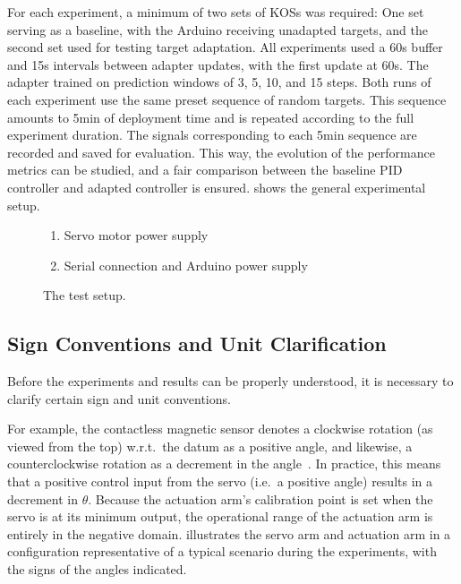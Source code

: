 For each experiment, a minimum of two sets of KOSs was required:
One set serving as a baseline, with the Arduino receiving unadapted targets, and the second set used for testing target adaptation.
All experiments used a 60\si{\second} buffer and 15\si{\second} intervals between adapter updates, with the first update at 60\si{\second}.
The adapter trained on prediction windows of 3, 5, 10, and 15 steps.
Both runs of each experiment use the same preset sequence of random targets.
This sequence amounts to 5\si{\minute} of deployment time and is repeated according to the full experiment duration.
The signals corresponding to each 5\si{\minute} sequence are recorded and saved for evaluation.
This way, the evolution of the performance metrics can be studied, and a fair comparison between the baseline PID controller and adapted controller is ensured.
 shows the general experimental setup.

\begin{figure}
    \centering
    \def\svgwidth{0.75\linewidth}
    \footnotesize\selectfont
    \begin{enumerate}
        \small
        \item Servo motor power supply \label{item:servo-power}
        \item Serial connection and Arduino power supply \label{item:serial}
    \end{enumerate}
    \caption{The test setup.}
    \label{fig:test-setup}
\end{figure}

\subsection{Sign Conventions and Unit Clarification}\label{subsec:sign-unit}
Before the experiments and results can be properly understood, it is necessary to clarify certain sign and unit conventions.

For example, the contactless magnetic sensor denotes a clockwise rotation (as viewed from the top) w.r.t.~the datum as a positive angle, and likewise, a counterclockwise rotation as a decrement in the angle~\parencite{RobTillaart}.
In practice, this means that a positive control input from the servo (i.e.~a positive angle) results in a decrement in $\theta$.
Because the actuation arm's calibration point is set when the servo is at its minimum output, the operational range of the actuation arm is entirely in the negative domain.
 illustrates the servo arm and actuation arm in a configuration representative of a typical scenario during the experiments, with the signs of the angles indicated.

